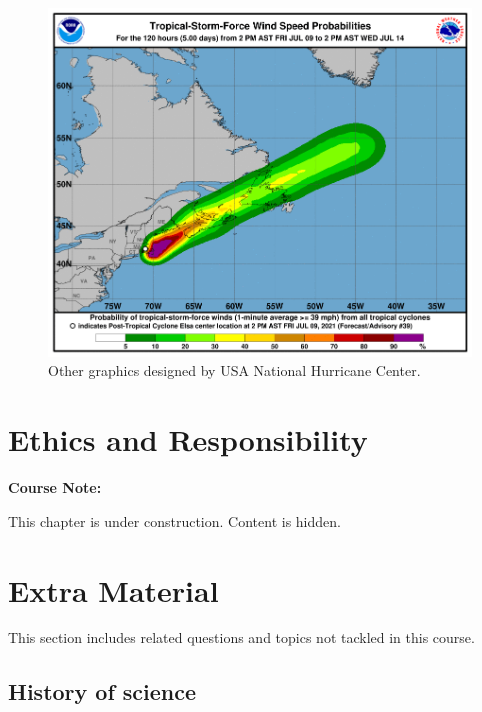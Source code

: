 \documentclass[
]{book}
\begin{document}
\begin{figure}

{\centering \includegraphics[width=0.66\linewidth]{Figures/hurricane-forecast-heat-map} 

}

\caption{Other graphics designed by USA National Hurricane Center.}\label{fig:hurricane-heatmap}
\end{figure}

\hypertarget{ethics-and-responsibility}{%
\chapter{Ethics and Responsibility}\label{ethics-and-responsibility}}

\begin{notebox}

\begin{center}
\textbf{Course Note:}

\end{center}

This chapter is under construction. Content is hidden.

\end{notebox}

\hypertarget{wont-fix}{%
\chapter{Extra Material}\label{wont-fix}}

This section includes related questions and topics not tackled in this course.

\hypertarget{history-of-science}{%
\section{History of science}\label{history-of-science}}
\end{document}
